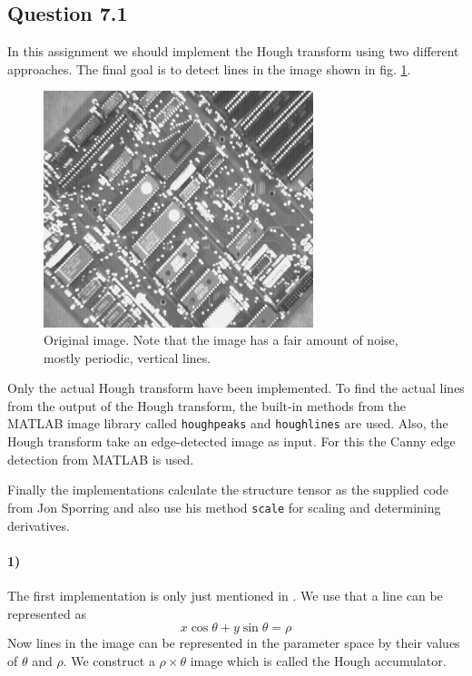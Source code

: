 \documentclass[a4paper, 10pt, final]{article}
\title{\mytitle}
\subtitle{\mysubtitle}
\author{\myauthor{} - \mymail}
\date{\mydate}
\begin{document}
\maketitle

\subsection*{Question 7.1}
In this assignment we should implement the Hough transform using two
different approaches. The final goal is to detect lines in the image
shown in fig. \ref{apple}.

\begin{figure}[h!]
    \centering
    \includegraphics[angle=0,width=0.7\textwidth]{images/apple}
    \caption{Original image. Note that the image has a fair amount of
    noise, mostly periodic, vertical lines.}
    \label{apple}
\end{figure}

Only the actual Hough transform have been implemented. To find the
actual lines from the output of the Hough transform, the built-in
methods from the MATLAB image library called \texttt{houghpeaks} and
\texttt{houghlines} are used. Also, the Hough transform take an
edge-detected image as input. For this the Canny edge detection from
MATLAB is used.

Finally the implementations calculate the structure tensor as the
supplied code from Jon Sporring and also use his method \texttt{scale}
for scaling and determining derivatives.

\paragraph{1)}
The first implementation is only just mentioned in \citep[section
16.5.2, p. 458-460]{jahne-digital}. We use that a line can be
represented as
\begin{equation}
    x\cos\theta+y\sin\theta = \rho
\end{equation}
Now lines in the image can be represented in the parameter space by
their values of $\theta$ and $\rho$. We construct a $\rho\times\theta$
image which is called the Hough accumulator.
\end{document}
